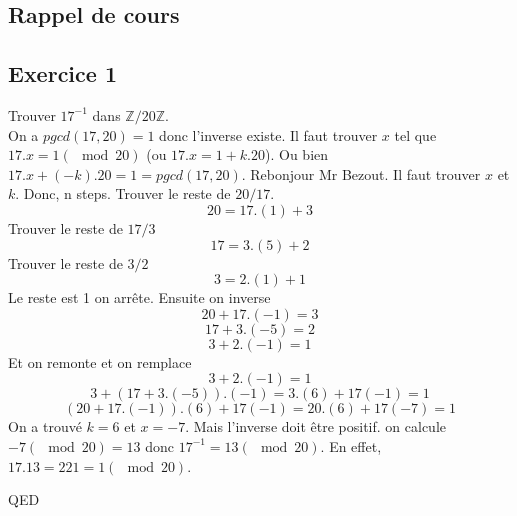 \documentclass[]{book}
\theoremstyle{definition}
\newcommand{\bb}[1]{\mathbb{#1}}
\newcommand{\Z}{\bb{Z}}
\begin{document}
\subsection*{Rappel de cours}



\newpage
\subsection*{Exercice 1}
Trouver $17^{-1}$ dans $\Z/20\Z$.\\
On a $pgcd(17,20) = 1$ donc l'inverse existe. Il faut trouver $x$ tel que $17.x = 1 (\mod 20)$ (ou $17.x = 1 + k.20$). Ou bien $17.x + (-k).20 = 1 = pgcd(17,20)$. Rebonjour Mr Bezout. Il 
faut trouver $x$ et $k$. Donc, n steps. Trouver le reste de $20/17$.
$$20 = 17.(1) + 3$$
Trouver le reste de $17/3$
$$17=3.(5) + 2$$
Trouver le reste de $3/2$
$$3=2.(1)+1$$
Le reste est 1 on arr\^ete. Ensuite on inverse
$$20 + 17.(-1) = 3$$
$$17 + 3.(-5) = 2$$
$$3+2.(-1)=1$$
Et on remonte et on remplace
$$3+2.(-1)=1$$
$$3+(17 + 3.(-5)).(-1)= 3.(6) + 17(-1) =1$$
$$(20 + 17.(-1)).(6) + 17(-1) = 20.(6) + 17(-7) = 1$$
On a trouv\'e $k=6$ et $x=-7$. Mais l'inverse doit \^etre positif. on calcule $-7 (\mod 20) = 13$ donc $17^{-1} = 13 (\mod 20)$. En effet, $17.13 = 221 = 1 (\mod 20)$.


QED
\end{document}
